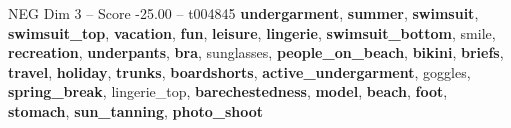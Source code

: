 \begin{textsample}{NEG Dim 3 – Score -25.00 – t004845}  \label{ex:f3_neg_012}
\textbf{undergarment}, \textbf{summer}, \textbf{swimsuit}, \textbf{swimsuit\_top}, \textbf{vacation}, \textbf{fun}, \textbf{leisure}, \textbf{lingerie}, \textbf{swimsuit\_bottom}, smile, \textbf{recreation}, \textbf{underpants}, \textbf{bra}, sunglasses, \textbf{people\_on\_beach}, \textbf{bikini}, \textbf{briefs}, \textbf{travel}, \textbf{holiday}, \textbf{trunks}, \textbf{boardshorts}, \textbf{active\_undergarment}, goggles, \textbf{spring\_break}, lingerie\_top, \textbf{barechestedness}, \textbf{model}, \textbf{beach}, \textbf{foot}, \textbf{stomach}, \textbf{sun\_tanning}, \textbf{photo\_shoot}

\end{textsample}

